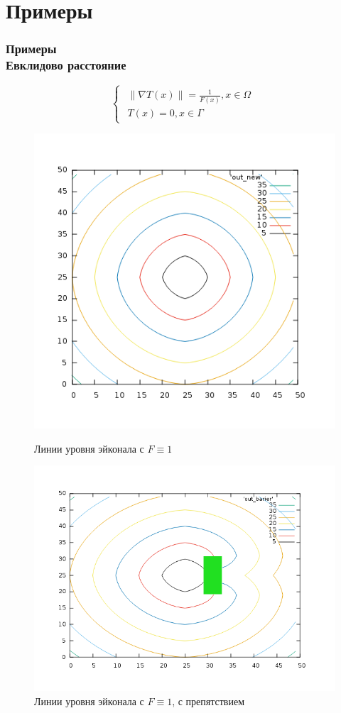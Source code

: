\documentclass[hyperref={unicode=true},professionalfont]{beamer}
\begin{document}
\section{Примеры}

\begin{frame}
  \frametitle{Примеры \\ Евклидово расстояние}

  \begin{equation}
    \label{eq:eik-sur}
    \begin{cases}
      \begin{array}{ll}
        \| \nabla T(x) \| = \frac{1}{F(x)}, x \in \Omega \\
        T(x) = 0, x \in \Gamma
      \end{array}\end{cases}
  \end{equation}


  \begin{figure}[ht]
    \begin{minipage}[h]{0.49\linewidth}
      \centering
      \includegraphics[width=0.7\linewidth]{eikonal_simple_surface.png}
      \hfil \caption{Линии уровня эйконала с $F\equiv 1$ }
      \label{fig:eikonal-surface}

    \end{minipage}
    \begin{minipage}[ht]{0.49\linewidth}
      \centering
      \includegraphics[width=0.7\linewidth]{barier_surface.png}
      \hfil \caption{Линии уровня эйконала с $F\equiv 1$, с препятствием}
      \label{fig:barier_surface}
    \end{minipage}
  \end{figure}

\end{frame}
\end{document}
